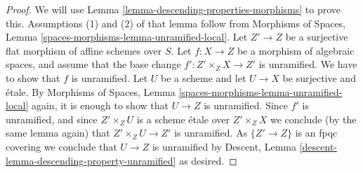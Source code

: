 \documentclass[10pt,a4paper]{amsart}
\theoremstyle{plain}
\theoremstyle{definition}
\theoremstyle{remark}
\numberwithin{equation}{subsection}
\begin{document}
\begin{proof}
We will use
Lemma \ref{lemma-descending-properties-morphisms}
to prove this. Assumptions (1) and (2) of that lemma follow from
Morphisms of Spaces,
Lemma \ref{spaces-morphisms-lemma-unramified-local}.
Let $Z' \to Z$ be a surjective flat morphism of affine schemes over $S$.
Let $f : X \to Z$ be a morphism of algebraic spaces, and assume
that the base change $f' : Z' \times_Z X \to Z'$ is unramified.
We have to show that $f$ is unramified. Let $U$ be a scheme
and let $U \to X$ be surjective and \'etale. By
Morphisms of Spaces,
Lemma \ref{spaces-morphisms-lemma-unramified-local}
again, it is enough to show that $U \to Z$ is unramified.
Since $f'$ is unramified, and since $Z' \times_Z U$ is a
scheme \'etale over $Z' \times_Z X$ we conclude (by the same lemma again) that
$Z' \times_Z U \to Z'$ is unramified.
As $\{Z' \to Z\}$ is an fpqc covering we conclude that
$U \to Z$ is unramified by
Descent, Lemma \ref{descent-lemma-descending-property-unramified}
as desired.
\end{proof}
\end{document}
